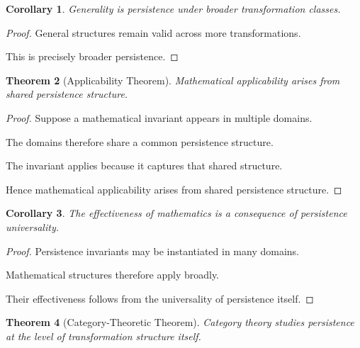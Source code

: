 \documentclass[12pt,oneside]{article}
\newtheorem{theorem}{Theorem}[section] \newtheorem{lemma}[theorem]{Lemma} \newtheorem{proposition}[theorem]{Proposition} \newtheorem{corollary}[theorem]{Corollary}
\theoremstyle{definition}
\begin{document}
\begin{corollary}

Generality is persistence under broader transformation classes.

\end{corollary}

\begin{proof}

General structures remain valid across more transformations.

This is precisely broader persistence.

\end{proof}

\begin{theorem}[Applicability Theorem]

Mathematical applicability arises from shared persistence structure.

\end{theorem}

\begin{proof}

Suppose a mathematical invariant appears in multiple domains.

The domains therefore share a common persistence structure.

The invariant applies because it captures that shared structure.

Hence mathematical applicability arises from shared persistence structure.

\end{proof}

\begin{corollary}

The effectiveness of mathematics is a consequence of persistence universality.

\end{corollary}

\begin{proof}

Persistence invariants may be instantiated in many domains.

Mathematical structures therefore apply broadly.

Their effectiveness follows from the universality of persistence itself.

\end{proof}

\begin{theorem}[Category-Theoretic Theorem]

Category theory studies persistence at the level of transformation structure itself.

\end{theorem}
\end{document}
